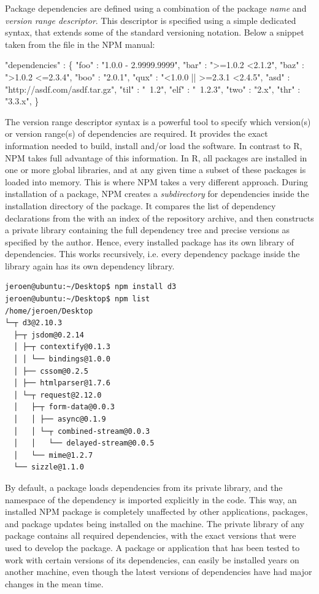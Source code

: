 Package dependencies are defined using a combination of the package \emph{name}
and \emph{version range descriptor}. This descriptor is specified using a
simple dedicated syntax, that extends some of the standard versioning notation.
Below a snippet taken from the  file in the NPM manual:

\begin{example}
   "dependencies" : \{
      "foo" : "1.0.0 - 2.9999.9999",
      "bar" : ">=1.0.2 <2.1.2",
      "baz" : ">1.0.2 <=2.3.4",
      "boo" : "2.0.1",
      "qux" : "<1.0.0 || >=2.3.1 <2.4.5",
      "asd" : "http://asdf.com/asdf.tar.gz",
      "til" : "~1.2",
      "elf" : "~1.2.3",
      "two" : "2.x",
      "thr" : "3.3.x",
   \}
\end{example}

\noindent The version range descriptor syntax is a powerful tool to specify
which version(s) or version range(s) of dependencies are required. It provides the exact
information needed to build, install and/or load the software. In contrast to R,
NPM takes full advantage of this information. In R, all packages are installed
in one or more global libraries, and at any given time a subset of these packages
is loaded into memory. This is where NPM takes a very different approach. During
installation of a package, NPM creates a \emph{subdirectory} for dependencies inside
the installation directory of the package. It compares the list of dependency
declarations from the  with an index of the repository archive,
and then constructs a private library containing the full dependency tree and precise
versions as specified by the author. Hence, every installed package has its own library
of dependencies. This works recursively, i.e. every dependency package inside
the library again has its own dependency library.

\begin{verbatim}
jeroen@ubuntu:~/Desktop$ npm install d3
jeroen@ubuntu:~/Desktop$ npm list
/home/jeroen/Desktop
└─┬ d3@2.10.3
  ├─┬ jsdom@0.2.14
  │ ├─┬ contextify@0.1.3
  │ │ └── bindings@1.0.0
  │ ├── cssom@0.2.5
  │ ├── htmlparser@1.7.6
  │ └─┬ request@2.12.0
  │   ├─┬ form-data@0.0.3
  │   │ ├── async@0.1.9
  │   │ └─┬ combined-stream@0.0.3
  │   │   └── delayed-stream@0.0.5
  │   └── mime@1.2.7
  └── sizzle@1.1.0
\end{verbatim}

\noindent By default, a package loads dependencies from its private library, and
the namespace of the dependency is imported explicitly in the code. This way, an
installed NPM package is completely unaffected by other applications, packages,
and package updates being installed on the machine. The private library of any
package contains all required dependencies, with the exact versions that
were used to develop the package. A package or application that has been
tested to work with certain versions of its dependencies, can easily be
installed years on another machine, even though the latest versions of
dependencies have had major changes in the mean time.

